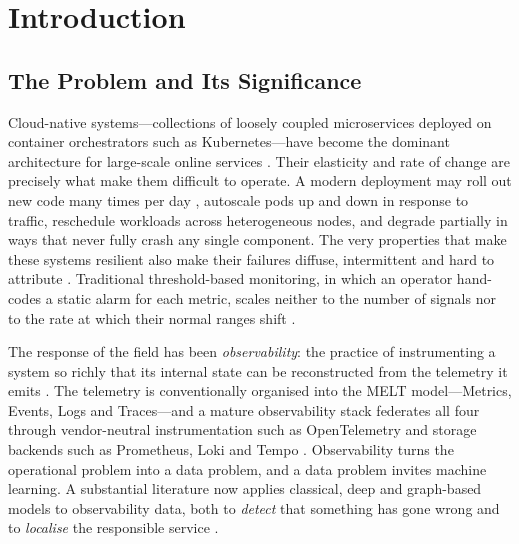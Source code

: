 \documentclass[pdflatex,sn-mathphys-num]{sn-jnl}%
\theoremstyle{thmstyleone}%
\theoremstyle{thmstyletwo}%
\theoremstyle{thmstylethree}%
\begin{document}

\maketitle

\section{Introduction}\label{sec:intro}

\subsection{The Problem and Its Significance}\label{sec:intro-problem}\label{sec:motivation}

Cloud-native systems---collections of loosely coupled microservices deployed on container orchestrators such as Kubernetes---have become the dominant architecture for large-scale online services \cite{cncf2024survey}. Their elasticity and rate of change are precisely what make them difficult to operate. A modern deployment may roll out new code many times per day \cite{dora2024}, autoscale pods up and down in response to traffic, reschedule workloads across heterogeneous nodes, and degrade partially in ways that never fully crash any single component. The very properties that make these systems resilient also make their failures diffuse, intermittent and hard to attribute \cite{mohammad2025resilient}. Traditional threshold-based monitoring, in which an operator hand-codes a static alarm for each metric, scales neither to the number of signals nor to the rate at which their normal ranges shift \cite{islam2021,mart2020}.

The response of the field has been \emph{observability}: the practice of instrumenting a system so richly that its internal state can be reconstructed from the telemetry it emits \cite{kosinska2023,boten2022}. The telemetry is conventionally organised into the MELT model---Metrics, Events, Logs and Traces---and a mature observability stack federates all four through vendor-neutral instrumentation such as OpenTelemetry and storage backends such as Prometheus, Loki and Tempo \cite{boten2022,chapman2023}. Observability turns the operational problem into a data problem, and a data problem invites machine learning. A substantial literature now applies classical, deep and graph-based models to observability data, both to \emph{detect} that something has gone wrong and to \emph{localise} the responsible service \cite{lomio2022,dkmak2025,han2024,wang2018,chen2025,raeiszadeh2026}.
\end{document}
